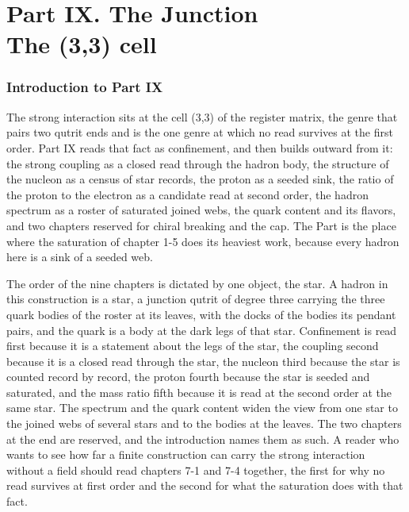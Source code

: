 \clearpage
\part*{Part IX. The Junction\\[5pt]{\large The (3,3) cell}}
\label{atlaspart:09-cell-3-3-strong}
\section*{Introduction to Part IX}\label{narr:part:VII}
The strong interaction sits at the cell (3,3) of the register matrix, the genre that pairs two qutrit ends and is the one genre at which no read survives at the first order. Part IX reads that fact as confinement, and then builds outward from it: the strong coupling as a closed read through the hadron body, the structure of the nucleon as a census of star records, the proton as a seeded sink, the ratio of the proton to the electron as a candidate read at second order, the hadron spectrum as a roster of saturated joined webs, the quark content and its flavors, and two chapters reserved for chiral breaking and the cap. The Part is the place where the saturation of chapter 1-5 does its heaviest work, because every hadron here is a sink of a seeded web.

The order of the nine chapters is dictated by one object, the star. A hadron in this construction is a star, a junction qutrit of degree three carrying the three quark bodies of the roster at its leaves, with the docks of the bodies its pendant pairs, and the quark is a body at the dark legs of that star. Confinement is read first because it is a statement about the legs of the star, the coupling second because it is a closed read through the star, the nucleon third because the star is counted record by record, the proton fourth because the star is seeded and saturated, and the mass ratio fifth because it is read at the second order at the same star. The spectrum and the quark content widen the view from one star to the joined webs of several stars and to the bodies at the leaves. The two chapters at the end are reserved, and the introduction names them as such. A reader who wants to see how far a finite construction can carry the strong interaction without a field should read chapters 7-1 and 7-4 together, the first for why no read survives at first order and the second for what the saturation does with that fact.

